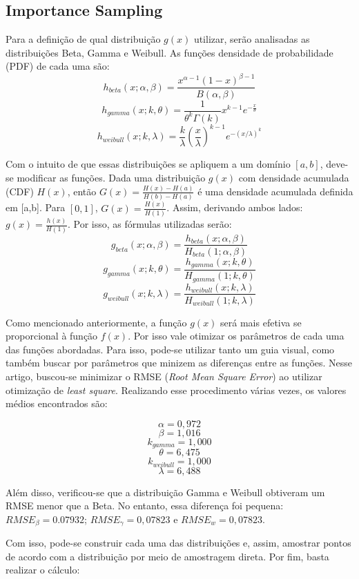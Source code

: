 \documentclass{article}
\begin{document}
\subsection{Importance Sampling}

Para a definição de qual distribuição $g(x)$ utilizar, serão analisadas as distribuições Beta, Gamma e Weibull. As funções densidade de probabilidade (PDF) de cada uma são:
\[ h_{beta}(x;\alpha,\beta) = \frac{x^{\alpha-1}(1-x)^{\beta-1}}{B(\alpha,\beta)} \]
\[ h_{gamma}(x;k,\theta) = \frac{1}{\theta^k \Gamma(k)} x^{k-1} e^{-\frac{x}{\theta}} \]
\[ h_{weibull}(x;k,\lambda) = \frac{k}{\lambda} \left(\frac{x}{\lambda}\right)^{k-1} e^{-(x/\lambda)^k} \]

Com o intuito de que essas distribuições se apliquem a um domínio $[a, b]$, deve-se modificar as funções. Dada uma distribuição $g(x)$ com densidade acumulada (CDF) $H(x)$, então $G(x) = \frac{H(x) - H(a)}{H(b) - H(a)}$ é uma densidade acumulada definida em [a,b]. Para $[0, 1]$, $G(x) = \frac{H(x)}{H(1)}$. Assim, derivando ambos lados: $g(x) = \frac{h(x)}{H(1)}$. Por isso, as fórmulas utilizadas serão:
\[ g_{beta}(x;\alpha,\beta) = \frac{h_{beta}(x;\alpha,\beta)}{H_{beta}(1;\alpha,\beta)} \]
\[ g_{gamma}(x;k,\theta) = \frac{h_{gamma}(x;k,\theta)}{H_{gamma}(1;k,\theta)} \]
\[ g_{weibull}(x;k,\lambda) = \frac{h_{weibull}(x;k,\lambda)}{H_{weibull}(1;k,\lambda)} \]

Como mencionado anteriormente, a função $g(x)$ será mais efetiva se proporcional à função $f(x)$. Por isso vale otimizar os parâmetros de cada uma das funções abordadas. Para isso, pode-se utilizar tanto um guia visual, como também buscar por parâmetros que minizem as diferenças entre as funções. Nesse artigo, buscou-se minimizar o RMSE (\textit{Root Mean Square Error}) ao utilizar otimização de \textit{least square}. Realizando esse procedimento várias vezes, os valores médios encontrados são:

\[ \alpha = 0,972 \]
\[ \beta = 1,016 \]
\[ k_{gamma} = 1,000 \]
\[ \theta = 6,475 \]
\[ k_{weibull} = 1,000 \]
\[ \lambda = 6,488 \]

Além disso, verificou-se que a distribuição Gamma e Weibull obtiveram um RMSE menor que a Beta. No entanto, essa diferença foi pequena: $RMSE_\beta = 0.07932$; $RMSE_\gamma=0,07823$ e $RMSE_w = 0,07823$.

Com isso, pode-se construir cada uma das distribuições e, assim, amostrar pontos de acordo com a distribuição por meio de amostragem direta. Por fim, basta realizar o cálculo:
\end{document}
